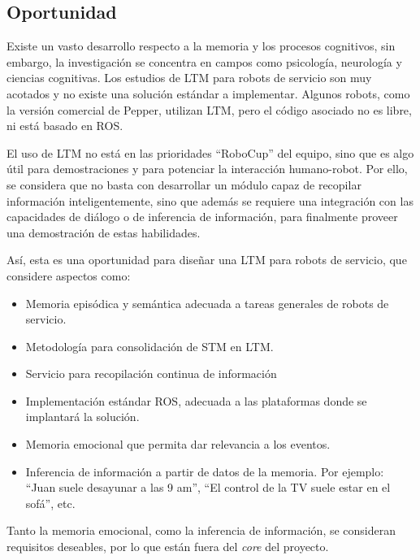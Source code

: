 \subsection{Oportunidad}

Existe un vasto desarrollo respecto a la memoria y los procesos cognitivos, sin embargo, la investigación se concentra en campos como psicología, neurología y ciencias cognitivas. Los estudios de LTM para robots de servicio son muy acotados y no existe una solución estándar a implementar. Algunos robots, como la versión comercial de Pepper, utilizan LTM, pero el código asociado no es libre, ni está basado en ROS.

El uso de LTM no está en las prioridades ``RoboCup'' del equipo, sino que es algo útil para demostraciones y para potenciar la interacción humano-robot. Por ello, se considera que no basta con desarrollar un módulo capaz de recopilar información inteligentemente, sino que además se requiere una integración con las capacidades de diálogo o de inferencia de información, para finalmente proveer una demostración de estas habilidades.

Así, esta es una oportunidad para diseñar una LTM para robots de servicio, que considere aspectos como: 
\begin{itemize}
\item Memoria episódica y semántica adecuada a tareas generales de robots de servicio.
\item Metodología para consolidación de STM en LTM.
\item Servicio para recopilación continua de información
\item Implementación estándar ROS, adecuada a las plataformas donde se implantará la solución.
\item Memoria emocional que permita dar relevancia a los eventos.
\item Inferencia de información a partir de datos de la memoria. Por ejemplo: ``Juan suele desayunar a las 9 am'', ``El control de la TV suele estar en el sofá'', etc.
\end{itemize}

Tanto la memoria emocional, como la inferencia de información, se consideran requisitos deseables, por lo que están fuera del \textit{core} del proyecto.

